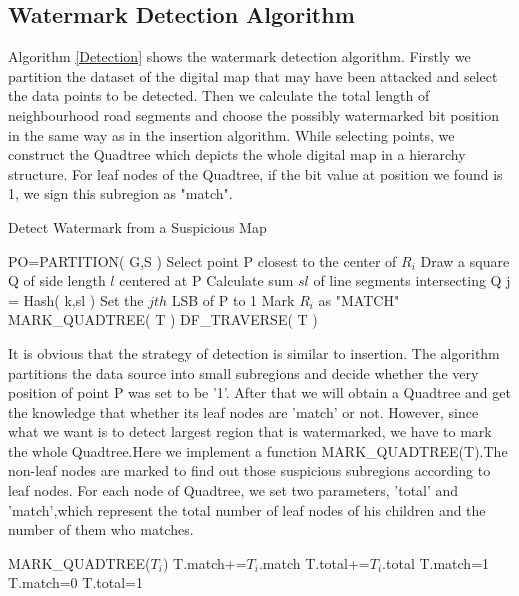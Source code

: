 \subsection{Watermark Detection Algorithm}
Algorithm \ref{Detection} shows the watermark detection algorithm. 
Firstly we partition the dataset of the digital map that may have
been attacked and select the data points to be detected.
Then we calculate the total length of neighbourhood road
segments and choose the possibly watermarked bit position
in the same way as in the insertion algorithm. While selecting points,
we construct the Quadtree which depicts the whole digital map
in a hierarchy structure. For leaf nodes of the Quadtree, if the bit value at 
position we found is 1, we sign this subregion as "match". 


\begin{algorithm}[h]
\caption{Detect Watermark from a Suspicious Map}
\label{Detection}
\begin{algorithmic}[1]
\State PO=PARTITION( G,S )
\State Select point P closest to the center of ${R}_{i}$
\State Draw a square Q of side length $l$ centered at P
\State Calculate sum $sl$ of line segments intersecting Q
\State j = Hash( k,sl )
\State Set the $jth$ LSB of P to 1
\State Mark ${R}_{i}$ as "MATCH"
\State MARK\_QUADTREE( T )
\State DF\_TRAVERSE( T )
\EndIf
\EndFor
\EndProcedure
\end{algorithmic}
\end{algorithm}


It is obvious that the strategy of detection is similar to insertion. The algorithm
partitions the data source into small subregions and decide whether the very position
of point P was set to be '1'. After that we will obtain a Quadtree and get the knowledge 
that whether its leaf nodes are 'match' or not. However, since what we want is to detect
largest region that is watermarked, we have to mark the whole Quadtree.Here we implement 
a function MARK\_QUADTREE(T).The non-leaf nodes are marked to find out those suspicious 
subregions according to leaf nodes. For each node of Quadtree, we set two parameters,
'total' and 'match',which represent the total number of leaf nodes of his children and the
number of them who matches.

\begin{algorithm}[h]
\begin{algorithmic}[1]
\Statex
{}
\State MARK\_QUADTREE(${T}_{i}$)
\State T.match+=${T}_{i}$.match
\State T.total+=${T}_{i}$.total 
\EndFor
\Else{}
\State T.match=1
\Else{}
\State T.match=0
\EndIf
\State T.total=1
\EndIf
\EndFunction
\end{algorithmic}
\end{algorithm}

